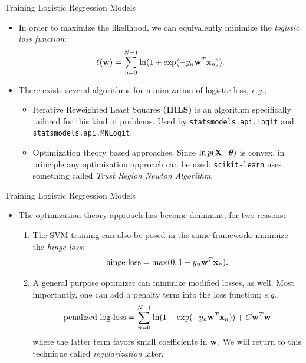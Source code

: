 \documentclass[10pt, aspectratio=169]{beamer} %
\newcommand{\thb}{\boldsymbol{\theta}}
\newcommand{\w}{{\bf w}}
\newcommand{\X}{{\bf X}}
\newcommand{\x}{{\bf x}}
\begin{document}
\begin{frame}[allowframebreaks]{Training Logistic Regression Models}
\begin{itemize}
\item In order to maximize the likelihood, we can equivalently minimize the 
\emph{logistic loss function}:
\[
\ell(\w) = \sum_{n = 0}^{N-1} \ln(1 + \exp(-y_n\w^T\x_n)).
\]
\item There exists several algorithms for minimization of logistic loss, \emph{e.g.,}
\begin{itemize}
	\item Iterative Reweighted Least Squares \textbf{(IRLS)} is an algorithm specifically tailored for this kind of problems. Used by \texttt{statsmodels.api.Logit} and \texttt{statsmodels.api.MNLogit}.
	\item Optimization theory based approaches. Since $\ln p(\X \mid \thb)$ is convex, in principle any optimization approach can be used. 
	\texttt{scikit-learn} uses something called \emph{Trust Region Newton Algorithm}.
\end{itemize}
\end{itemize}
\end{frame}

\begin{frame}[allowframebreaks]{Training Logistic Regression Models}
\begin{itemize}
\item The optimization theory approach has become dominant, for two reasons:
\begin{enumerate}
	\item The SVM training can also be posed in the same framework: minimize the \emph{hinge loss}:
	\[
	\text{hinge-loss} = \max(0, 1-y_n\w^T\x_n).
	\]
	\item A general purpose optimizer can minimize modified losses, as well. Most importantly,
	one can add a penalty term into the loss function; \emph{e.g.,}
	\[
	\text{penalized log-loss} = \sum_{n = 0}^{N-1} \ln(1 + \exp(-y_n\w^T\x_n)) + C \w^T\w
	\]
	where the latter term favors small coefficients in $\w$. We will return to this
	technique called \emph{regularization} later.
\end{enumerate}
\end{itemize}
\end{frame}
\end{document}
